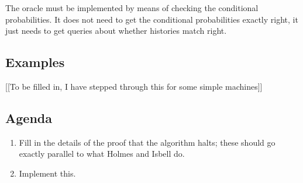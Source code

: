 \documentclass[../new-procedure.tex]{subfiles}
\begin{document}
The oracle must be implemented by means of checking the conditional
probabilities.  It does not need to get the conditional probabilities exactly
right, it just needs to get queries about whether histories match right.


\subsection{Examples}

[[To be filled in, I have stepped through this for some simple machines]]

\subsection{Agenda}

\begin{enumerate}
\item Fill in the details of the proof that the algorithm halts; these should
  go exactly parallel to what Holmes and Isbell do.
\item Implement this.
\end{enumerate}
\end{document}

